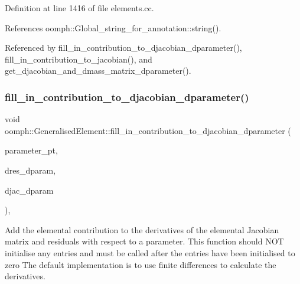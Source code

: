Definition at line 1416 of file elements.\+cc.



References oomph\+::\+Global\+\_\+string\+\_\+for\+\_\+annotation\+::string().



Referenced by fill\+\_\+in\+\_\+contribution\+\_\+to\+\_\+djacobian\+\_\+dparameter(), fill\+\_\+in\+\_\+contribution\+\_\+to\+\_\+jacobian(), and get\+\_\+djacobian\+\_\+and\+\_\+dmass\+\_\+matrix\+\_\+dparameter().

\mbox{\label{classoomph_1_1GeneralisedElement_a90ee6ee39dd3950f625148d960f1ba67}} 
\subsubsection{\texorpdfstring{fill\+\_\+in\+\_\+contribution\+\_\+to\+\_\+djacobian\+\_\+dparameter()}{fill\_in\_contribution\_to\_djacobian\_dparameter()}}
{\footnotesize\ttfamily void oomph\+::\+Generalised\+Element\+::fill\+\_\+in\+\_\+contribution\+\_\+to\+\_\+djacobian\+\_\+dparameter (\begin{DoxyParamCaption}\item[{double $\ast$const \&}]{parameter\+\_\+pt,  }\item[{\hyperlink{classoomph_1_1Vector}{Vector}$<$ double $>$ \&}]{dres\+\_\+dparam,  }\item[{\hyperlink{classoomph_1_1DenseMatrix}{Dense\+Matrix}$<$ double $>$ \&}]{djac\+\_\+dparam }\end{DoxyParamCaption})\hspace{0.3cm}{\ttfamily [protected]}, {\ttfamily [virtual]}}



Add the elemental contribution to the derivatives of the elemental Jacobian matrix and residuals with respect to a parameter. This function should N\+OT initialise any entries and must be called after the entries have been initialised to zero The default implementation is to use finite differences to calculate the derivatives. 

